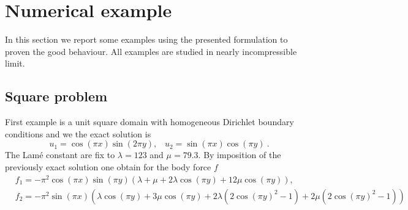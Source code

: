 \section{Numerical example}
In this section we report some examples using the presented formulation to proven the good behaviour. All examples are studied in nearly incompressible limit. 

\subsection{Square problem}
First example is a unit square domain with homogeneous Dirichlet boundary conditions and we the exact solution is
\begin{equation}\label{eq:exact_solution}
u_{1} = \cos (\pi x) \sin(2\pi y), \hspace{10pt} 
u_{2} = \sin(\pi x)\cos(\pi y)\:.
\end{equation} 
The Lamé constant are fix to $\lambda = 123$ and $\mu=79.3$. %
By imposition of the previously exact solution one obtain for the body force $f$
\begin{equation}
\begin{split}
&f_{1} = -\pi^{2} \cos(\pi x) \sin(\pi y) \left( \lambda + \mu + 2\lambda\cos(\pi y) + 
12\mu\cos(\pi y)\right), \\
&f_{2} = -\pi^{2}\sin(\pi x)\left( \lambda\cos(\pi y) + 3\mu\cos(\pi y) + 2\lambda\left(2\cos(\pi y)^{2} 
- 1\right) + 2\mu\left(2\cos(\pi y)^{2} - 1\right) \right)
\end{split}
\end{equation}


